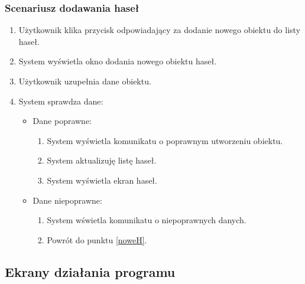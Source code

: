 \documentclass[a4paper]{article}
\begin{document}
\subsubsection{Scenariusz dodawania haseł}
\begin{enumerate}
    \item Użytkownik klika przycisk odpowiadający za dodanie nowego obiektu do listy haseł.
    \item System wyświetla okno dodania nowego obiektu haseł.\label{noweH}
    \item Użytkownik uzupełnia dane obiektu.
    \item System sprawdza dane:
    \begin{itemize}
        \item Dane poprawne:
        \begin{enumerate}
            \item System wyświetla  komunikatu o poprawnym utworzeniu obiektu.
            \item System aktualizuję listę haseł.
            \item System wyświetla ekran haseł.
        \end{enumerate}
        \item Dane niepoprawne:
        \begin{enumerate}
            \item System wświetla komunikatu o niepoprawnych danych.
            \item Powrót do punktu \ref{noweH}.
        \end{enumerate}
    \end{itemize}
\end{enumerate}


\newpage

\subsection{Ekrany działania programu}
\end{document}
